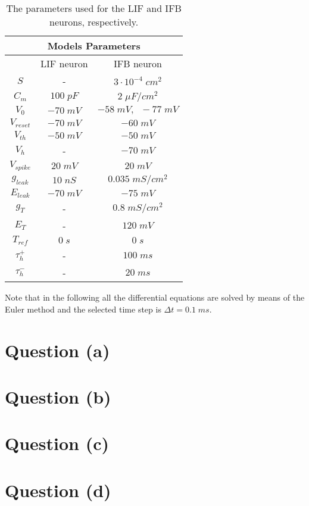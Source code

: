 \documentclass[11pt]{article}
\begin{document}
\begin{table}[!h]
    \begin{center}
        \begin{tabular}{ |c||c|c|  }
            \hline
            \multicolumn{3}{|c|}{Models Parameters}                      \\
            \hline
            {}               & LIF neuron  & IFB neuron                  \\
            \hline
            \(S\)            & -           & \(3\cdot{10^{-4}}\;cm^{2}\) \\
            \(C_{m}\)        & \(100\;pF\) & \(2\;\mu{F}/cm^{2}\)        \\
            \(V_{0}\)        & \(-70\;mV\) & \(-58\;mV,\;\;-77\;mV\)     \\
            \(V_{reset}\)    & \(-70\;mV\) & \(-60\;mV\)                 \\
            \(V_{th}\)       & \(-50\;mV\) & \(-50\;mV\)                 \\
            \(V_{h}\)        & -           & \(-70\;mV\)                 \\
            \(V_{spike}\)    & \(20\;mV\)  & \(20\;mV\)                  \\
            \(g_{leak}\)     & \(10\;nS\)  & \(0.035\;mS/cm^{2}\)        \\
            \(E_{leak}\)     & \(-70\;mV\) & \(-75\;mV\)                 \\
            \(g_{T}\)        & -           & \(0.8\;mS/cm^{2}\)          \\
            \(E_{T}\)        & -           & \(120\;mV\)                 \\
            \(T_{ref}\)      & \(0\;s\)    & \(0\;s\)                    \\
            \(\tau_{h}^{+}\) & -           & \(100\;ms\)                 \\
            \(\tau_{h}^{-}\) & -           & \(20\;ms\)                  \\
            \hline
        \end{tabular}
        \caption{\label{parameters-table}The parameters used for the LIF and IFB neurons, respectively.}
    \end{center}
\end{table}

Note that in the following all the differential equations are solved by means of the Euler
method and the selected time step is \(\Delta{t}=0.1\;ms\).

\section*{Question (a)}


\section*{Question (b)}

\section*{Question (c)}

\section*{Question (d)}
\end{document}
